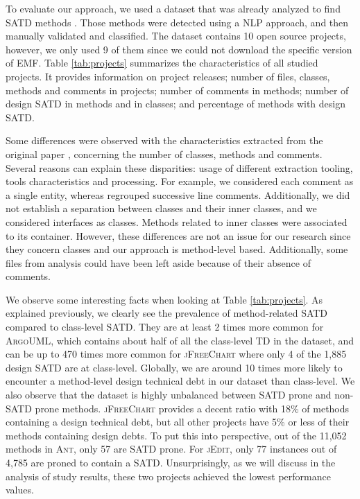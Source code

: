 To evaluate our approach, we used a dataset that was already analyzed to find \ac{SATD} methods \citep{maldonado17}. Those methods were detected using a NLP approach, and then manually validated and classified. The dataset contains 10 open source projects, however, we only used 9 of them since we could not download the specific version of EMF. Table \ref{tab:projects} summarizes the characteristics of all studied projects. It provides information on project releases; number of files, classes, methods and comments in projects; number of comments in methods; number of design \ac{SATD} in methods and in classes; and percentage of methods with design \ac{SATD}. \par

Some differences were observed with the characteristics extracted from the original paper \citep{maldonado17}, concerning the number of classes, methods and comments. Several reasons can explain these disparities: usage of different extraction tooling, tools characteristics and processing. For example, we considered each comment as a single entity, whereas \citet{maldonado17} regrouped successive line comments. Additionally, we did not establish a separation between classes and their inner classes, and we considered interfaces as classes. Methods related to inner classes were associated to its container. However, these differences are not an issue for our research since they concern classes and our approach is method-level based. Additionally, some files from \citet{maldonado17} analysis could have been left aside because of their absence of comments. \par 

We observe some interesting facts when looking at Table \ref{tab:projects}. As explained previously, we clearly see the prevalence of method-related \ac{SATD} compared to class-level \ac{SATD}. They are at least 2 times more common for \textsc{ArgoUML}, which contains about half of all the class-level \ac{TD} in the dataset, and can be up to 470 times more common for \textsc{jFreeChart} where only 4 of the 1,885 design \ac{SATD} are at class-level. Globally, we are around 10 times more likely to encounter a method-level design technical debt in our dataset than class-level. We also observe that the dataset is highly unbalanced between \ac{SATD} prone and non-\ac{SATD} prone methods. \textsc{jFreeChart} provides a decent ratio with 18\% of methods containing a design technical debt, but all other projects have 5\% or less of their methods containing design debts. To put this into perspective, out of the 11,052 methods in \textsc{Ant}, only 57 are \ac{SATD} prone. For \textsc{jEdit}, only 77 instances out of 4,785 are proned to contain a \ac{SATD}. Unsurprisingly, as we will discuss in the analysis of study results, these two projects achieved the lowest performance values. \par 

